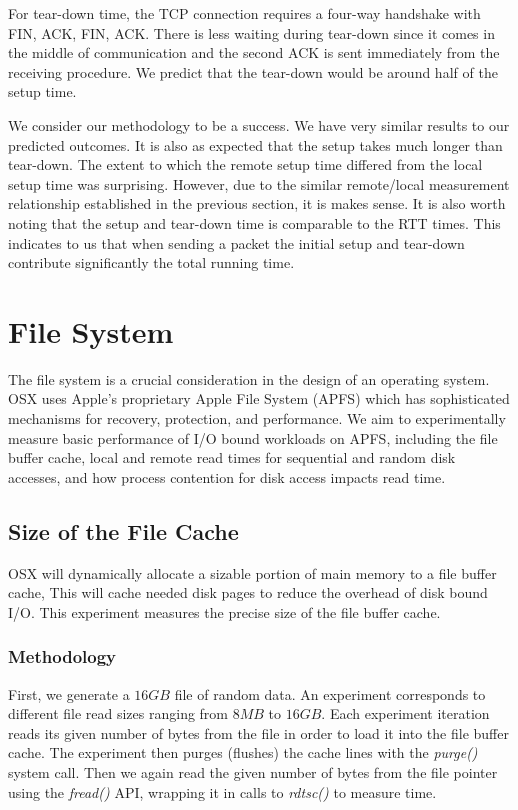 \documentclass[sigconf]{acmart}
\begin{document}
For tear-down time, the TCP connection requires a four-way handshake with FIN, ACK, FIN, ACK. There is less waiting during tear-down since it comes in the middle of communication and the second ACK is sent immediately from the receiving procedure. We predict that the tear-down would be around half of the setup time.

We consider our methodology to be a success. We have very similar results to our predicted outcomes. It is also as expected that the setup takes much longer than tear-down. The extent to which the remote setup time differed from the local setup time was surprising. However, due to the similar remote/local measurement relationship established in the previous section, it is makes sense. It is also worth noting that the setup and tear-down time is comparable to the RTT times. This indicates to us that when sending a packet the initial setup and tear-down contribute significantly the total running time.

\section{File System}
The file system is a crucial consideration in the design of an operating system. OSX uses Apple's proprietary Apple File System (APFS) which has sophisticated mechanisms for recovery, protection, and performance. We aim to experimentally measure basic performance of I/O bound workloads on APFS, including the file buffer cache, local and remote read times for sequential and random disk accesses, and how process contention for disk access impacts read time.

\subsection{Size of the File Cache}
OSX will dynamically allocate a sizable portion of main memory to a file buffer cache, This will cache needed disk pages to reduce the overhead of disk bound I/O. This experiment measures the precise size of the file buffer cache. 

\subsubsection{Methodology}
First, we generate a $16GB$ file of random data. An experiment corresponds to different file read sizes ranging from $8MB$ to $16GB$. Each experiment iteration reads its given number of bytes from the file in order to load it into the file buffer cache. The experiment then purges (flushes) the cache lines with the \textit{purge()} system call. Then we again read the given number of bytes from the file pointer using the \textit{fread()} API, wrapping it in calls to \textit{rdtsc()} to measure time. 
\end{document}
